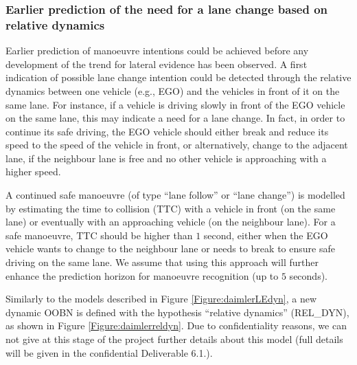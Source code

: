\subsubsection{Earlier prediction of the need for a lane change based on relative dynamics}

Earlier prediction of manoeuvre intentions could be achieved before any development of the trend for lateral evidence has been observed. A first indication of possible lane change intention could be detected through the relative dynamics between one vehicle (e.g., EGO) and the vehicles in front of it on the same lane. For instance, if a vehicle is driving slowly in front of the EGO vehicle on the same lane, this may indicate a need for a lane change. In fact, in order to continue its safe driving, the EGO vehicle should either break and reduce its speed to the speed of the vehicle in front, or alternatively, change to the adjacent lane, if the neighbour lane is free and no other vehicle is approaching with a higher speed. 

A continued safe manoeuvre (of type ``lane follow'' or ``lane change'') is modelled by estimating the time to collision (TTC) with a vehicle in front (on the same lane) or eventually with an approaching vehicle (on the neighbour lane). For a safe manoeuvre, TTC should be higher than $1$ second, either when the EGO vehicle wants to change to the neighbour lane or needs to break to ensure safe driving on the same lane. We assume that using this approach will further enhance the prediction horizon for manoeuvre recognition (up to $5$ seconds).

Similarly to the models described in Figure \ref{Figure:daimlerLEdyn}, a new dynamic OOBN is defined with the hypothesis ``relative dynamics'' (REL\_DYN), as shown in Figure \ref{Figure:daimlerreldyn}.  Due to confidentiality reasons, we can not give at this stage of the project further details about this model (full details will be given in the confidential Deliverable 6.1.).

 
